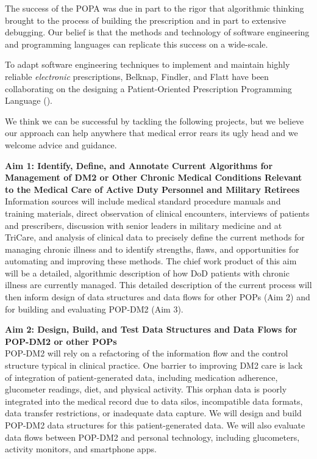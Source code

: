 \documentclass[11pt]{article}
\begin{document}
The success of the POPA was due in part to the rigor that algorithmic
thinking brought to the process of building the prescription and in
part to extensive debugging. Our belief is that the methods and
technology of software engineering and programming languages can
replicate this success on a wide-scale.

To adapt software engineering techniques to implement and maintain
highly reliable \emph{electronic} prescriptions, Belknap, Findler, and
Flatt have been collaborating on the designing a Patient-Oriented
Prescription Programming Language (\poppl{}). 

We think we can be successful by tackling the following projects, but
we believe our approach can help anywhere that medical error rears its
ugly head and we welcome advice and guidance.

\newcommand{\aim}[1]{\vspace{.1in}\noindent\textbf{Aim #1}\\}

\aim{1: Identify, Define, and Annotate Current Algorithms for
  Management of DM2 or Other Chronic Medical Conditions Relevant
  to the Medical Care of Active Duty Personnel and Military Retirees}
 Information sources will include medical standard procedure manuals
 and training materials, direct observation of clinical encounters,
 interviews of patients and prescribers, discussion with senior
 leaders in military medicine and at TriCare, and analysis of clinical
 data to precisely define the current methods for managing chronic
 illness and to identify strengths, flaws, and opportunities for
 automating and improving these methods. The chief work product of
 this aim will be a detailed, algorithmic description of how DoD
 patients with chronic illness are currently managed. This detailed
 description of the current process will then inform design of data
 structures and data flows for other POPs (Aim 2) and for building and
 evaluating POP-DM2 (Aim 3).

\aim{2: Design, Build, and Test Data Structures and Data Flows for POP-DM2 or other POPs}
 POP-DM2 will rely on a refactoring of the information flow and the
 control structure typical in clinical practice. One barrier to
 improving DM2 care is lack of integration of patient-generated data,
 including medication adherence, glucometer readings, diet, and
 physical activity. This orphan data is poorly integrated into the
 medical record due to data silos, incompatible data formats, data
 transfer restrictions, or inadequate data capture. We will design and
 build POP-DM2 data structures for this patient-generated data. We
 will also evaluate data flows between POP-DM2 and personal
 technology, including glucometers, activity monitors, and smartphone
 apps. 
\end{document}
